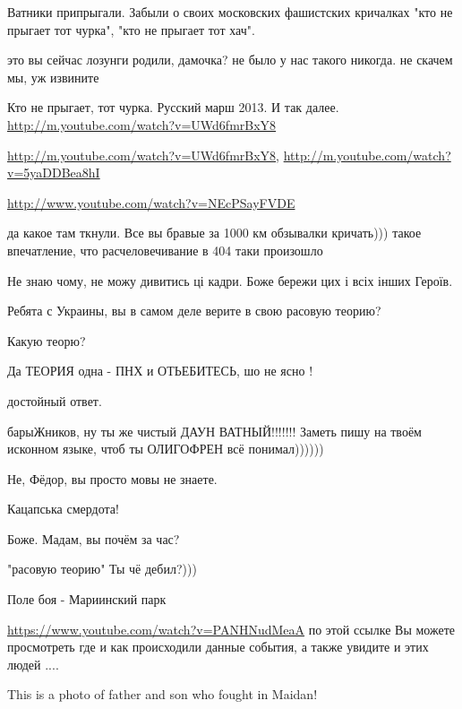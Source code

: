 
Ватники припрыгали. Забыли о своих московских фашистских кричалках "кто не
прыгает тот чурка", "кто не прыгает тот хач".

\begin{itemize} %
это вы сейчас лозунги родили, дамочка? не было у нас такого никогда. не скачем мы, уж извините

Кто не прыгает, тот чурка. Русский марш 2013. И так далее. \url{http://m.youtube.com/watch?v=UWd6fmrBxY8}

\url{http://m.youtube.com/watch?v=UWd6fmrBxY8}, \url{http://m.youtube.com/watch?v=5yaDDBea8hI}

\url{http://www.youtube.com/watch?v=NEcPSayFVDE}

да какое там ткнули. Все вы бравые за 1000 км обзывалки кричать))) такое
впечатление, что расчеловечивание в 404 таки произошло

\end{itemize} %

Не знаю чому, не можу дивитись ці кадри. Боже бережи цих і всіх інших Героїв.

Ребята с Украины, вы в самом деле верите в свою расовую теорию?

\begin{itemize} %
Какую теорю?

Да ТЕОРИЯ одна - ПНХ и ОТЬЕБИТЕСЬ, шо не ясно !

достойный ответ.

барыЖников, ну ты же чистый ДАУН ВАТНЫЙ!!!!!!! Заметь пишу на твоём исконном языке, чтоб ты ОЛИГОФРЕН всё понимал))))))

Не, Фёдор, вы просто мовы не знаете.

Кацапська смердота!

Боже. Мадам, вы почём за час?

"расовую теорию" Ты чё дебил?)))
\end{itemize} %

Поле боя - Мариинский парк

\url{https://www.youtube.com/watch?v=PANHNudMeaA} по этой ссылке Вы можете просмотреть где и как происходили данные события, а также увидите и этих людей ....

This is a photo of father and son who fought in Maidan!

